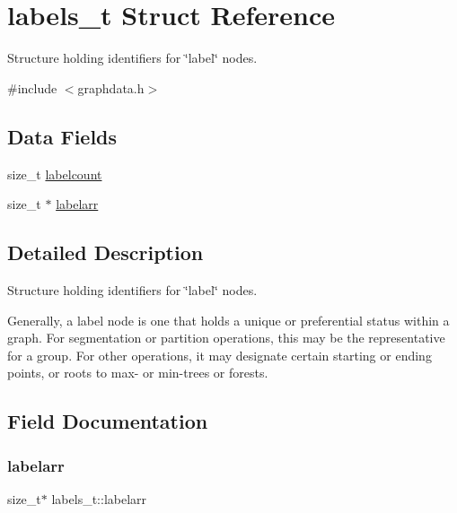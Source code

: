 \hypertarget{structlabels__t}{}\section{labels\+\_\+t Struct Reference}
\label{structlabels__t}


Structure holding identifiers for \char`\"{}label\char`\"{} nodes.  




{\ttfamily \#include $<$graphdata.\+h$>$}

\subsection*{Data Fields}
\begin{DoxyCompactItemize}
\item 
size\+\_\+t \hyperlink{structlabels__t_af5b7ba7df24db052d4eb4d762a027039}{labelcount}
\item 
size\+\_\+t $\ast$ \hyperlink{structlabels__t_a629db8e17b21047f88e4f7e484522593}{labelarr}
\end{DoxyCompactItemize}


\subsection{Detailed Description}
Structure holding identifiers for \char`\"{}label\char`\"{} nodes. 

Generally, a label node is one that holds a unique or preferential status within a graph. For segmentation or partition operations, this may be the representative for a group. For other operations, it may designate certain starting or ending points, or roots to max-\/ or min-\/trees or forests. 

\subsection{Field Documentation}
\mbox{\label{structlabels__t_a629db8e17b21047f88e4f7e484522593}} 
\subsubsection{\texorpdfstring{labelarr}{labelarr}}
{\footnotesize\ttfamily size\+\_\+t$\ast$ labels\+\_\+t\+::labelarr}

